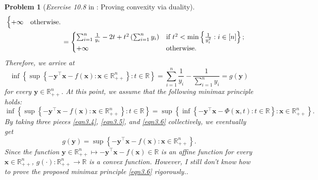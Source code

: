 \documentclass[11pt]{article}
\newtheorem{problem}{Problem}
\numberwithin{equation}{problem}
\begin{document}
\begin{problem} [\emph{Exercise 10.8} in \cite{calafiore2014optimization}: Proving convexity via duality]
{\begin{equation*}
\begin{split}
\begin{cases}
            + \infty & \textnormal{otherwise.}
        \end{cases} \\
        &= 
        \begin{cases}
            \sum_{i=1}^{n} \frac{1}{y_i} - 2t + t^2 \left( \sum_{i=1}^{n} y_i \right)  & \textnormal{if } t^2 < \min \left\{ \frac{1}{y_{i}^2} : i \in [n] \right\}; \\
            + \infty & \textnormal{otherwise.}
        \end{cases}
    \end{split}
\end{equation*}
Therefore, we arrive at
\begin{equation}
    \label{eqn3.5}
    \inf \left\{ \sup \left\{ - \mathbf{y}^{\top} \mathbf{x} - f(\mathbf{x}) : \mathbf{x} \in \mathbb{R}_{++}^n \right\} : t \in \mathbb{R} \right\} = \sum_{i=1}^{n} \frac{1}{y_i} - \frac{1}{\sum_{i=1}^{n} y_i} = g(\mathbf{y})
\end{equation}
for every $\mathbf{y} \in \mathbb{R}_{++}^n$. At this point, we assume that the following minimax principle holds:
\begin{equation}
    \label{eqn3.6}
    \inf \left\{ \sup \left\{ - \mathbf{y}^{\top} \mathbf{x} - f(\mathbf{x}) : \mathbf{x} \in \mathbb{R}_{++}^n \right\} : t \in \mathbb{R} \right\} = \sup \left\{ \inf \left\{ - \mathbf{y}^{\top} \mathbf{x} - \Phi \left( \mathbf{x}, t \right) : t \in \mathbb{R} \right\} : \mathbf{x} \in \mathbb{R}_{++}^n \right\}.
\end{equation}
By taking three pieces \eqref{eqn3.4}, \eqref{eqn3.5}, and \eqref{eqn3.6} collectively, we eventually get
\begin{equation*}
    g(\mathbf{y}) = \sup \left\{ - \mathbf{y}^{\top} \mathbf{x} - f(\mathbf{x}) : \mathbf{x} \in \mathbb{R}_{++}^n \right\}.
\end{equation*}
Since the function $\mathbf{y} \in \mathbb{R}_{++}^n \mapsto - \mathbf{y}^{\top} \mathbf{x} - f(\mathbf{x}) \in \mathbb{R}$ is an affine function for every $\mathbf{x} \in \mathbb{R}_{++}^n$, $g(\cdot) : \mathbb{R}_{++}^n \rightarrow \mathbb{R}$ is a convex function. However, I still don't know how to prove the proposed minimax principle \eqref{eqn3.6} rigorously..
}
\end{problem}

\newpage



\end{document}

